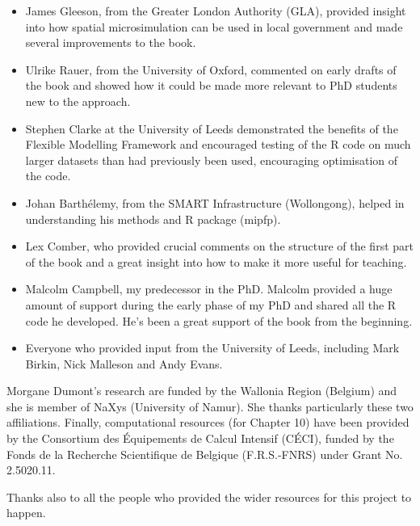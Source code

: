  \begin{itemize}
   \item James Gleeson, from the Greater London Authority (GLA), provided insight
   into how spatial microsimulation can be used in local government and made several
   improvements to the book.
   \item Ulrike Rauer, from the University of Oxford, commented on
   early drafts of the book and showed how it could be made more relevant to PhD
   students new to the approach.
   \item Stephen Clarke at the University of Leeds demonstrated the benefits of
   the Flexible Modelling Framework and encouraged testing of the R code on much
   larger datasets than had previously been used, encouraging optimisation of the code.
   \item Johan Barthélemy, from the SMART Infrastructure (Wollongong), helped in
   understanding his methods and R package (mipfp).
   \item Lex Comber, who provided crucial comments on the structure of the first part of the book and a great insight into how to make it more useful for teaching.
   \item Malcolm Campbell, my predecessor in the PhD. Malcolm provided a huge amount of support during the early phase of my PhD and shared
all the R code he developed. He's been a great support of the book from the beginning.
   \item Everyone who provided input from the University of Leeds, including Mark Birkin, Nick Malleson and Andy Evans.
 \end{itemize}
 
 Morgane Dumont's research are funded by the Wallonia Region (Belgium) and she 
 is member of NaXys (University of Namur). She thanks particularly these two affiliations.
 Finally, computational resources (for Chapter 10) have been provided by the Consortium des Équipements de 
 Calcul Intensif (CÉCI), funded by the Fonds de la Recherche Scientifique de Belgique 
 (F.R.S.-FNRS) under Grant No. 2.5020.11.
 
 Thanks also to all the people
 who provided the wider resources for this project to happen.



